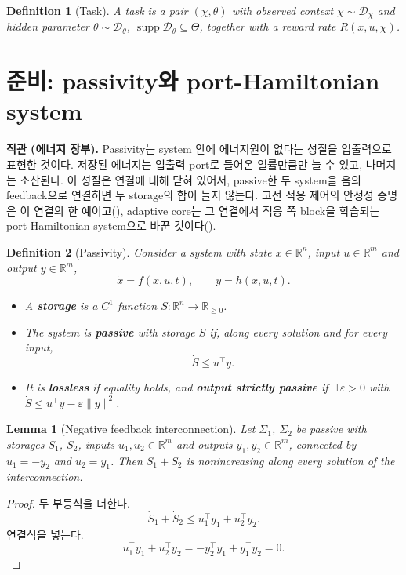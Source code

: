 \documentclass[11pt]{article}\usepackage[margin=1in]{geometry}\usepackage{amsmath,amssymb,amsthm,mathtools}\usepackage{graphicx}\graphicspath{{figures/}{../figures/}{figs/}{./}}\usepackage{enumitem}\usepackage{hyperref}\usepackage{cleveref}\usepackage{tikz}\usetikzlibrary{arrows.meta,positioning,calc,shapes.geometric}\usepackage{float}\usepackage{rotating}\usepackage[most]{tcolorbox}\usepackage{kotex}\usepackage{booktabs}\emergencystretch=1.6em\tolerance=2000 \crefname{assumption}{Assumption}{Assumptions}\Crefname{assumption}{Assumption}{Assumptions}\crefname{definition}{Definition}{Definitions}\Crefname{definition}{Definition}{Definitions}\crefname{proposition}{Proposition}{Propositions}\Crefname{proposition}{Proposition}{Propositions}\crefname{fact}{Fact}{Facts}\Crefname{fact}{Fact}{Facts} \newtheorem{assumption}{Assumption}\newtheorem{definition}{Definition}\newtheorem{lemma}{Lemma}\newtheorem{proposition}{Proposition}\newtheorem{theorem}{Theorem}\newtheorem{corollary}{Corollary}\newtheorem{fact}{Fact}\theoremstyle{remark}\newtheorem{remark}{Remark} \newcommand{\R}{\mathbb{R}}\newcommand{\xb}{\bar x}\newcommand{\Ab}{\bar A}\newcommand{\By}{\bar B_y}\newcommand{\U}{\mathcal U}\newcommand{\Z}{\mathcal Z}
\begin{document}
\begin{definition}[Task]
\label{def:task}
A task is a pair $(\chi,\theta)$ with observed context $\chi\sim\mathcal D_\chi$ and hidden parameter $\theta\sim\mathcal D_\theta$, $\operatorname{supp}\mathcal D_\theta\subseteq\Theta$, together with a reward rate $R(x,u,\chi)$.
\end{definition}

\section{준비: passivity와 port-Hamiltonian system}
\label{sec:prelim}

\textbf{직관 (에너지 장부).} Passivity는 system 안에 에너지원이 없다는 성질을 입출력으로 표현한 것이다. 저장된 에너지는 입출력 port로 들어온 일률만큼만 늘 수 있고, 나머지는 소산된다. 이 성질은 연결에 대해 닫혀 있어서, passive한 두 system을 음의 feedback으로 연결하면 두 storage의 합이 늘지 않는다. 고전 적응 제어의 안정성 증명은 이 연결의 한 예이고(), adaptive core는 그 연결에서 적응 쪽 block을 학습되는 port-Hamiltonian system으로 바꾼 것이다().

\begin{definition}[Passivity]
\label{def:passive}
Consider a system with state $x\in\R^{n}$, input $u\in\R^{m}$ and output $y\in\R^{m}$,
\[
\dot x=f(x,u,t),\qquad y=h(x,u,t).
\]
\begin{itemize}
\item A \textbf{\emph{storage}} is a $C^1$ function $S:\R^n\to\R_{\ge0}$.
\item The system is \textbf{\emph{passive}} with storage $S$ if, along every solution and for every input,
\[
\dot S\le u^\top y .
\]
\item It is \textbf{\emph{lossless}} if equality holds, and \textbf{\emph{output strictly passive}} if $\exists\,\varepsilon>0$ with $\dot S\le u^\top y-\varepsilon\|y\|^2$.
\end{itemize}
\end{definition}

\begin{lemma}[Negative feedback interconnection]
\label{lem:interconnect}
Let $\Sigma_1$, $\Sigma_2$ be passive with storages $S_1$, $S_2$, inputs $u_1,u_2\in\R^m$ and outputs $y_1,y_2\in\R^m$, connected by $u_1=-y_2$ and $u_2=y_1$. Then $S_1+S_2$ is nonincreasing along every solution of the interconnection.
\end{lemma}

\begin{proof}
두 부등식을 더한다.
\[
\dot S_1+\dot S_2\le u_1^\top y_1+u_2^\top y_2 .
\]
연결식을 넣는다.
\[
u_1^\top y_1+u_2^\top y_2=-y_2^\top y_1+y_1^\top y_2=0 .
\]
\end{proof}
\end{document}
